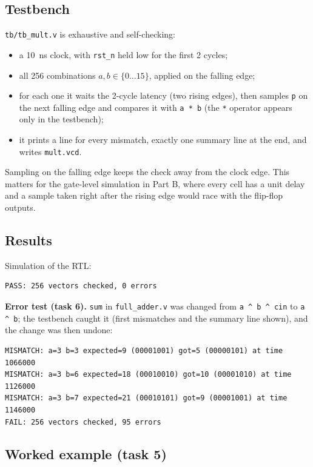 \documentclass[11pt,a4paper]{article}
\begin{document}
\subsection{Testbench}

\texttt{tb/tb\_mult.v} is exhaustive and self-checking:
\begin{itemize}
  \item a 10~ns clock, with \texttt{rst\_n} held low for the first 2 cycles;
  \item all 256 combinations $a, b \in \{0 \ldots 15\}$, applied on the falling edge;
  \item for each one it waits the 2-cycle latency (two rising edges), then samples
        \texttt{p} on the next falling edge and compares it with \texttt{a * b}
        (the \texttt{*} operator appears only in the testbench);
  \item it prints a line for every mismatch, exactly one summary line at the end,
        and writes \texttt{mult.vcd}.
\end{itemize}
Sampling on the falling edge keeps the check away from the clock edge. This matters
for the gate-level simulation in Part B, where every cell has a unit delay and a
sample taken right after the rising edge would race with the flip-flop outputs.

\subsection{Results}

Simulation of the RTL:
\begin{Verbatim}[frame=single, fontsize=\small]
PASS: 256 vectors checked, 0 errors
\end{Verbatim}

\textbf{Error test (task 6).} \texttt{sum} in \texttt{full\_adder.v} was changed
from \texttt{a \^{} b \^{} cin} to \texttt{a \^{} b}; the testbench caught it (first
mismatches and the summary line shown), and the change was then undone:
\begin{Verbatim}[frame=single, fontsize=\small]
MISMATCH: a=3 b=3 expected=9 (00001001) got=5 (00000101) at time 1066000
MISMATCH: a=3 b=6 expected=18 (00010010) got=10 (00001010) at time 1126000
MISMATCH: a=3 b=7 expected=21 (00010101) got=9 (00001001) at time 1146000
FAIL: 256 vectors checked, 95 errors
\end{Verbatim}

\subsection{Worked example (task 5)}
\end{document}
